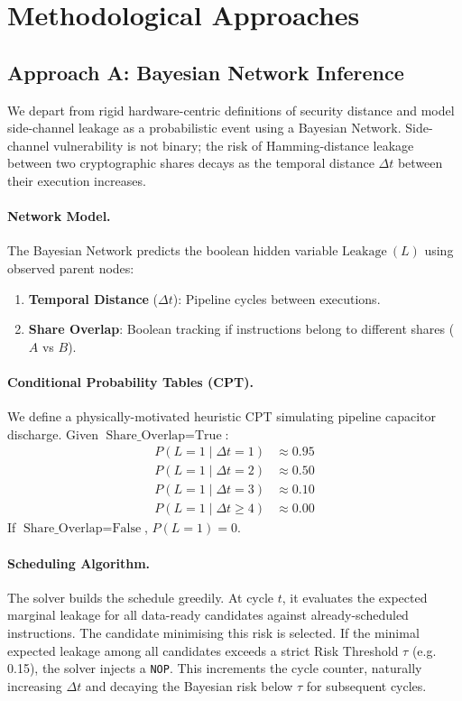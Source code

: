 \documentclass[letterpaper]{article}
\newcommand{\approachA}{\textcolor{bayesColor}{\textbf{Approach A}}}
\begin{document}
\section{Methodological Approaches}
\label{sec:methods}

\subsection{\approachA: Bayesian Network Inference}

We depart from rigid hardware-centric definitions of security distance and
model side-channel leakage as a probabilistic event using a Bayesian Network. Side-channel vulnerability is not binary; the risk
of Hamming-distance leakage between two cryptographic shares decays
as the temporal distance $\Delta t$ between their execution increases.

\paragraph{Network Model.}
The Bayesian Network predicts the boolean hidden variable $\text{Leakage}\ (L)$
using observed parent nodes:
\begin{enumerate}\setlength\itemsep{0pt}
  \item \textbf{Temporal Distance} ($\Delta t$): Pipeline cycles between executions.
  \item \textbf{Share Overlap}: Boolean tracking if instructions belong to different shares ($A$ vs $B$).
\end{enumerate}

\paragraph{Conditional Probability Tables (CPT).}
We define a physically-motivated heuristic CPT simulating pipeline capacitor discharge.
Given $\text{Share\_Overlap} = \text{True}$:
\begin{align*}
  P(L=1 \mid \Delta t=1)     & \approx 0.95 \\
  P(L=1 \mid \Delta t=2)     & \approx 0.50 \\
  P(L=1 \mid \Delta t=3)     & \approx 0.10 \\
  P(L=1 \mid \Delta t \ge 4) & \approx 0.00
\end{align*}
If $\text{Share\_Overlap} = \text{False}$, $P(L=1)=0$.

\paragraph{Scheduling Algorithm.}
The solver builds the schedule greedily. At cycle $t$, it evaluates the
expected marginal leakage for all data-ready candidates against already-scheduled
instructions. The candidate minimising this risk is selected. If the minimal
expected leakage among all candidates exceeds a strict Risk Threshold $\tau$ (e.g. 0.15),
the solver injects a \texttt{NOP}. This increments the cycle counter, naturally
increasing $\Delta t$ and decaying the Bayesian risk below $\tau$ for subsequent cycles.
\end{document}
